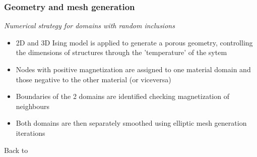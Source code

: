 \documentclass[first,firstsupp,lastsupp,handout,last,hyperref,table]{ETHclass}
\begin{document}
\begin{frame}[t]
\frametitle{Geometry and mesh generation}
\centering
\textit{Numerical strategy for domains with random inclusions}
\vspace{0.2cm}
{\footnotesize
\begin{itemize}
\item 2D and 3D Ising model is applied to generate a porous geometry, controlling the dimensions of structures through the 'temperature' of the sytem
\item Nodes with positive magnetization are assigned to one material domain and those negative to the other material (or viceversa)
\item Boundaries of the 2 domains are identified checking magnetization of neighbours
\item Both domains are then separately smoothed using elliptic mesh generation iterations
\end{itemize}
}
{\small
\raggedleft
Back to \hyperlink{mesh2}{}
}
\end{frame}





%        
%          

\begin{frame}[plain]
\frametitle{}
\end{frame}
\end{document}
